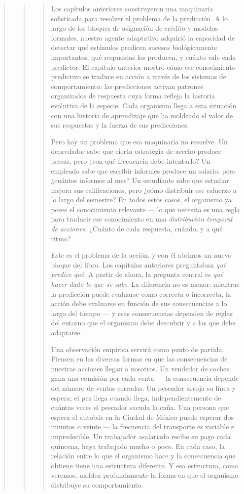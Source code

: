 \documentclass[
  letterpaper,
  DIV=11,
  numbers=noendperiod]{scrreprt}
\begin{document}
\begin{tcolorbox}[enhanced jigsaw, arc=.35mm, bottomrule=.15mm, breakable, colback=white, colframe=quarto-callout-note-color-frame, left=2mm, leftrule=.75mm, opacityback=0, rightrule=.15mm, toprule=.15mm]
\begin{quote}
\begin{quote}
\begin{quote}
Los capítulos anteriores construyeron una maquinaria sofisticada para
resolver el problema de la predicción. A lo largo de los bloques de
asignación de crédito y modelos formales, nuestro agente adaptativo
adquirió la capacidad de detectar qué estímulos predicen sucesos
biológicamente importantes, qué respuestas los producen, y cuánto vale
cada predictor. El capítulo anterior mostró cómo ese conocimiento
predictivo se traduce en acción a través de los sistemas de
comportamiento: las predicciones activan patrones organizados de
respuesta cuya forma refleja la historia evolutiva de la especie. Cada
organismo llega a esta situación con una historia de aprendizaje que ha
moldeado el valor de sus respuestas y la fuerza de sus predicciones.

Pero hay un problema que esa maquinaria no resuelve. Un depredador sabe
que cierta estrategia de acecho produce presas, pero ¿con qué frecuencia
debe intentarlo? Un empleado sabe que escribir informes produce un
salario, pero ¿cuántos informes al mes? Un estudiante sabe que estudiar
mejora sus calificaciones, pero ¿cómo distribuir ese esfuerzo a lo largo
del semestre? En todos estos casos, el organismo ya posee el
conocimiento relevante --- lo que necesita es una regla para traducir
ese conocimiento en una \emph{distribución temporal de acciones}.
¿Cuánto de cada respuesta, cuándo, y a qué ritmo?

Este es el problema de la acción, y con él abrimos un nuevo bloque del
libro. Los capítulos anteriores preguntaban \emph{qué predice qué}. A
partir de ahora, la pregunta central es \emph{qué hacer dado lo que se
sabe}. La diferencia no es menor: mientras la predicción puede evaluarse
como correcta o incorrecta, la acción debe evaluarse en función de sus
consecuencias a lo largo del tiempo --- y esas consecuencias dependen de
reglas del entorno que el organismo debe descubrir y a las que debe
adaptarse.

Una observación empírica servirá como punto de partida. Piensen en las
diversas formas en que las consecuencias de nuestras acciones llegan a
nosotros. Un vendedor de coches gana una comisión por cada venta --- la
consecuencia depende del número de ventas cerradas. Un pescador arroja
su línea y espera; el pez llega cuando llega, independientemente de
cuántas veces el pescador sacuda la caña. Una persona que espera el
autobús en la Ciudad de México puede esperar dos minutos o veinte --- la
frecuencia del transporte es variable e impredecible. Un trabajador
asalariado recibe su pago cada quincena, haya trabajado mucho o poco. En
cada caso, la relación entre lo que el organismo hace y la consecuencia
que obtiene tiene una estructura diferente. Y esa estructura, como
veremos, moldea profundamente la forma en que el organismo distribuye su
comportamiento.


\end{quote}
\end{quote}
\end{quote}
\end{tcolorbox}
\end{document}
